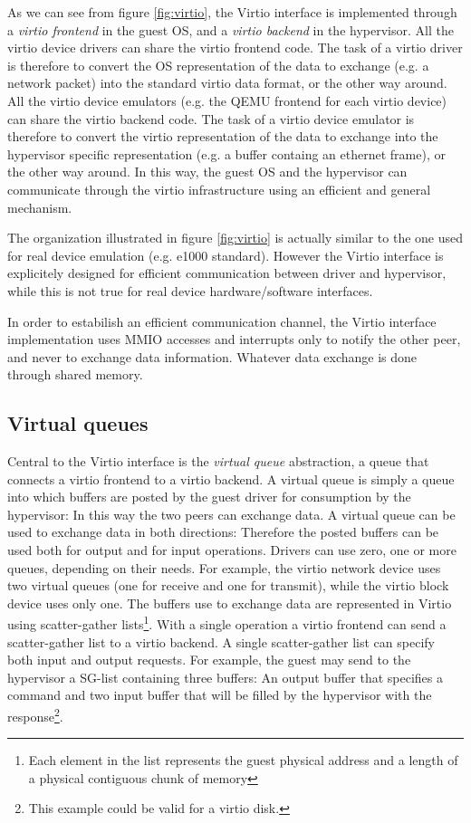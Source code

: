 As we can see from figure \ref{fig:virtio}, the Virtio interface is implemented through a \emph{virtio frontend} in the guest OS, and a 
\emph{virtio backend} in the hypervisor.
All the virtio device drivers can share the virtio frontend code. The task of a virtio driver is therefore to
convert the OS representation of the data to exchange (e.g. a network packet) into the standard virtio data format, or the other way
around. All the virtio device emulators (e.g. the QEMU frontend for each virtio device) can share the virtio backend code. The task
of a virtio device emulator is therefore to convert the virtio representation of the data to exchange into the hypervisor specific
representation (e.g. a buffer containg an ethernet frame), or the other way around. In this way, the guest OS and the hypervisor can
communicate through the virtio infrastructure using an efficient and general mechanism.

\vspace{0.5cm}

The organization illustrated in figure \ref{fig:virtio} is actually similar to the one used for real device emulation (e.g. e1000 standard).
However the Virtio interface is explicitely designed for efficient communication between driver and hypervisor,
while this is not true for real device hardware/software interfaces.

\vspace{0.5cm}

In order to estabilish an efficient communication channel, the Virtio interface implementation uses MMIO accesses and interrupts only
to notify the other peer, and never to exchange data information. Whatever data exchange is done through shared memory.


\subsection{Virtual queues}
\label{sec:virtqueue}
Central to the Virtio interface is the \emph{virtual queue} abstraction, a queue that connects a virtio frontend to a virtio backend.
A virtual queue is simply a queue into which buffers are posted by the guest driver for consumption by the hypervisor: In this way
the two peers can exchange data.
A virtual queue can be used to exchange data in both directions: Therefore the posted buffers can be used both for output and for input 
operations. Drivers can use zero, one or more queues, depending on their needs. For example, the virtio network device uses two virtual
queues (one for receive and one for transmit), while the virtio block device uses only one.
The buffers use to exchange data are represented in Virtio using scatter-gather lists\footnote{Each
element in the list represents the guest physical address and a length of a physical contiguous chunk of memory}. With a single operation
a virtio frontend can send a scatter-gather list to a virtio backend. A single scatter-gather list can specify both input and output 
requests. For example, the guest may send to the hypervisor a SG-list containing three buffers: An output buffer that specifies a 
command and two input buffer that will be filled by the hypervisor with the response\footnote{This example could be valid for a virtio
disk.}.

